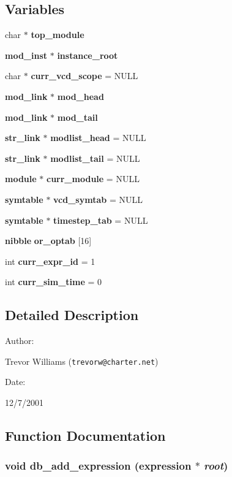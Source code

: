\subsection*{Variables}
\begin{CompactItemize}
\item 
char $\ast$ {\bf top\_\-module}
\item 
{\bf mod\_\-inst} $\ast$ {\bf instance\_\-root}
\item 
char $\ast$ {\bf curr\_\-vcd\_\-scope} = NULL
\item 
{\bf mod\_\-link} $\ast$ {\bf mod\_\-head}
\item 
{\bf mod\_\-link} $\ast$ {\bf mod\_\-tail}
\item 
{\bf str\_\-link} $\ast$ {\bf modlist\_\-head} = NULL
\item 
{\bf str\_\-link} $\ast$ {\bf modlist\_\-tail} = NULL
\item 
{\bf module} $\ast$ {\bf curr\_\-module} = NULL
\item 
{\bf symtable} $\ast$ {\bf vcd\_\-symtab} = NULL
\item 
{\bf symtable} $\ast$ {\bf timestep\_\-tab} = NULL
\item 
{\bf nibble} {\bf or\_\-optab} [16]
\item 
int {\bf curr\_\-expr\_\-id} = 1
\item 
int {\bf curr\_\-sim\_\-time} = 0
\end{CompactItemize}


\subsection{Detailed Description}


\begin{Desc}
\item[Author: ]\par
Trevor Williams ({\tt trevorw@charter.net}) \end{Desc}
\begin{Desc}
\item[Date: ]\par
12/7/2001\end{Desc}


\subsection{Function Documentation}
\subsubsection{\setlength{\rightskip}{0pt plus 5cm}void db\_\-add\_\-expression ({\bf expression} $\ast$ {\em root})}\label{db_8c_a21}


